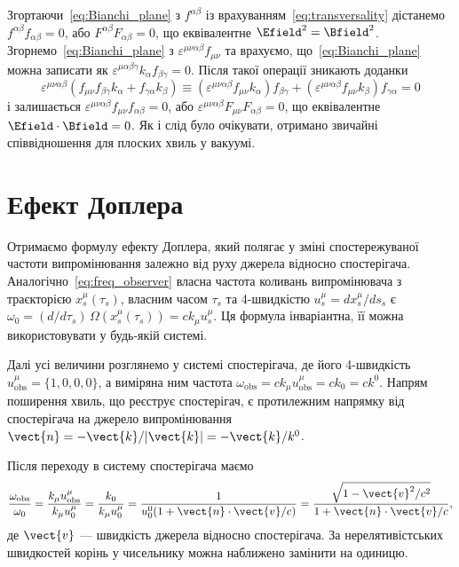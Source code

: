 Згортаючи~\eqref{eq:Bianchi_plane} з $f^{\alpha\beta}$ із врахуванням~\eqref{eq:transversality} дістанемо $f^{\alpha\beta}f_{\alpha\beta}=0$, або $F^{\alpha\beta}F_{\alpha\beta}=0$, що еквівалентне $\Efield^2=\Bfield^2$. Згорнемо~\eqref{eq:Bianchi_plane} з $\varepsilon^{\mu\nu\alpha\beta}f_{\mu\nu}$ та врахуємо, що~\eqref{eq:Bianchi_plane} можна записати як $\varepsilon^{\mu\alpha\beta\gamma}k_{\alpha}f_{\beta\gamma}=0$. Після такої операції зникають доданки
\begin{equation*}
    \varepsilon^{\mu\nu\alpha\beta}(f_{\mu\nu}f_{\beta\gamma}k_{\alpha}
    + f_{\gamma\alpha}k_{\beta})
    \equiv (\varepsilon^{\mu\nu\alpha\beta}f_{\mu\nu}k_{\alpha})f_{\beta\gamma}
    + (\varepsilon^{\mu\nu\alpha\beta}f_{\mu\nu}k_{\beta})f_{\gamma\alpha} = 0
\end{equation*}
і залишається $\varepsilon^{\mu\nu\alpha\beta}f_{\mu\nu}f_{\alpha\beta}=0$, або $\varepsilon^{\mu\nu\alpha\beta}F_{\mu\nu}F_{\alpha\beta}=0$, що еквівалентне $\Efield\cdot\Bfield=0$. Як і слід було очікувати, отримано звичайні співвідношення для плоских хвиль у вакуумі.

\section{Ефект Доплера}

Отримаємо формулу ефекту Доплера, який полягає у зміні спостережуваної частоти випромінювання залежно від руху джерела відносно спостерігача. Аналогічно~\eqref{eq:freq_observer} власна частота коливань випромінювача з траєкторією $x_s^{\mu}(\tau_s)$, власним часом $\tau_s$ та 4-швидкістю $u_s^{\mu}=dx_s^{\mu}/ds_s$ є $\omega_0 = (d/d\tau_s)\,\Omega(x_s^{\mu}(\tau_s)) = ck_{\mu}u_s^{\mu}$. Ця формула інваріантна, її можна використовувати у будь-якій системі.

Далі усі величини розглянемо у системі спостерігача, де його 4-швидкість $u_{\text{obs}}^{\mu}=\{1,0,0,0\}$, а виміряна ним частота $\omega_{\text{obs}}=ck_{\mu}u_{\text{obs}}^{\mu}=ck_0=ck^0$. Напрям поширення хвиль, що реєструє спостерігач, є протилежним напрямку від спостерігача на джерело випромінювання $\vect{n}=-\vect{k}/|\vect{k}|=-\vect{k}/k^0$.

Після переходу в систему спостерігача маємо
\begin{equation}\label{eq:Dopler}
    \frac{\omega_{\text{obs}}}{\omega_0}
    = \frac{k_{\mu}u_{\text{obs}}^{\mu}}{k_{\mu}u_0^{\mu}}
    = \frac{k_0}{k_{\mu}u_0^{\mu}}
    = \frac{1}{u_0^0(1+\vect{n}\cdot\vect{v}/c)}
    = \frac{\sqrt{1-\vect{v}^2/c^2}}{1+\vect{n}\cdot\vect{v}/c},
\end{equation}
де $\vect{v}$ --- швидкість джерела відносно спостерігача. За нерелятивістських швидкостей корінь у чисельнику можна наближено замінити на одиницю.

